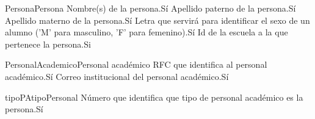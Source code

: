 \begin{cdtEntidad}{Persona}{Persona}
	{Nombre(s) de la persona.}{Sí}
	{Apellido paterno de la persona.}{Sí}
	{Apellido materno de la persona.}{Sí}
	{Letra que servirá para identificar el sexo de un alumno ('M' para masculino, 'F' para femenino).}{Sí}
	{Id de la escuela a la que pertenece la persona.}{Si}
\end{cdtEntidad}
\begin{cdtEntidad}{PersonalAcademico}{Personal académico}
	{RFC que identifica al personal académico.}{Sí}
	{Correo institucional del personal académico.}{Sí}
\end{cdtEntidad}
\begin{cdtEntidad}{tipoPA}{tipoPersonal}
	{Número que identifica que tipo de personal académico es la persona.}{Sí}
\end{cdtEntidad}
